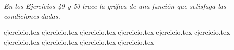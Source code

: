 \noindent \textit{En los Ejercicios 49 y 50 trace la gráfica de una función que satisfaga las condiciones dadas.}

\begin{enumerate}
    \setcounter{enumi}{48}
    {ejercicio.tex}
    {ejercicio.tex}
    {ejercicio.tex}
    {ejercicio.tex}
    {ejercicio.tex}
    {ejercicio.tex}
    {ejercicio.tex}
    {ejercicio.tex}
    {ejercicio.tex}
    {ejercicio.tex}
\end{enumerate}
